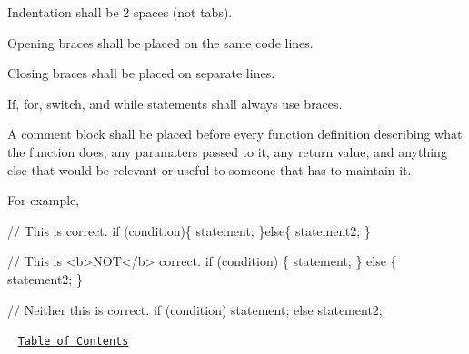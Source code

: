 \begin{DoxyItemize}
\item Indentation shall be 2 spaces (not tabs).
\item Opening braces shall be placed on the same code lines.
\item Closing braces shall be placed on separate lines.
\item If, for, switch, and while statements shall always use braces.
\item A comment block shall be placed before every function definition describing what the function does, any paramaters passed to it, any return value, and anything else that would be relevant or useful to someone that has to maintain it.
\end{DoxyItemize}

For example, ~\newline
 
\begin{DoxyCode}
\textcolor{comment}{// This is correct.}
\textcolor{keywordflow}{if} (condition)\{
  statement;
\}\textcolor{keywordflow}{else}\{
  statement2;
\}

\textcolor{comment}{// This is <b>NOT</b> correct.}
\textcolor{keywordflow}{if} (condition)
\{
  statement;
\}
\textcolor{keywordflow}{else}
\{
  statement2;
\}

\textcolor{comment}{// Neither this is correct.}
\textcolor{keywordflow}{if} (condition)
  statement;
\textcolor{keywordflow}{else}
  statement2;
\end{DoxyCode}


~\newline
\href{#Contents}{\tt Table of Contents}~\newline
 

 
